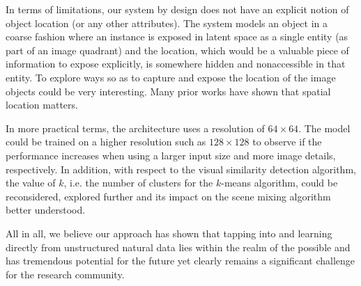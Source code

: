 \documentclass[a4paper,12pt]{report}
\begin{document}
In terms of limitations, our system by design does not have an explicit notion of object location (or any other attributes). The system models an object in a coarse fashion where an instance is exposed in latent space as a single entity (as part of an image quadrant) and the location, which would be a valuable piece of information to expose explicitly, is somewhere hidden and nonaccessible in that entity. To explore ways so as to capture and expose the location of the image objects could be very interesting. Many prior works have shown that spatial location matters.

In more practical terms, the architecture uses a resolution of $64 \times 64$. The model could be trained on a higher resolution such as $128 \times 128$ to observe if the performance increases when using a larger input size and more image details, respectively. In addition, with respect to the visual similarity detection algorithm, the value of $k$, i.e. the number of clusters for the $k$-means algorithm, could be reconsidered, explored further and its impact on the scene mixing algorithm better understood.

All in all, we believe our approach has shown that tapping into and learning directly from unstructured natural data lies within the realm of the possible and has tremendous potential for the future yet clearly remains a significant challenge for the research community.




\cleardoublepage
{}
{}
\listoffigures
\cleardoublepage
{}
{}
\listoftables
\newpage

\cleardoublepage
{}
{}
\printbibliography

\appendix




\end{document}
